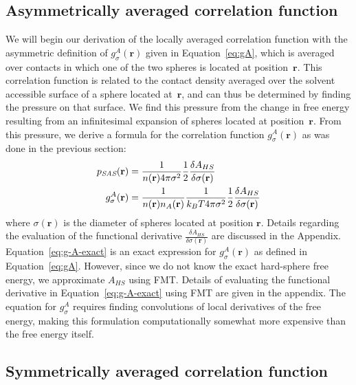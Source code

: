 \documentclass[letterpaper,twocolumn,amsmath,amssymb,pre]{revtex4-1}
\newcommand{\rr}{\textbf{r}}
\newcommand{\derivation}[1]{} %
\begin{document}
\subsection{Asymmetrically averaged correlation function}\label{sec:g-A}

We will begin our derivation of the locally averaged correlation
function with the asymmetric definition of $g_\sigma^A(\rr)$ given in
Equation~\ref{eq:gA}, which is averaged over contacts in which one of
the two spheres is located at position~$\rr$.  This correlation
function is related to the contact density averaged over the solvent accessible surface
of a sphere located at~$\rr$, and can thus be determined by finding
the pressure on that surface.  We find this pressure from the change in
free energy resulting from an infinitesimal expansion of spheres
located at position~$\rr$.  From this pressure, we derive a
formula for the correlation function $g_\sigma^A(\rr)$ as was done in
the previous section:
\begin{align}
  p_{\textit{SAS}}(\mathbf{r}) &= \frac{1}{n(\rr) 4\pi \sigma^2}\frac12 \frac{\delta
    A_{HS}}{\delta \sigma(\mathbf{r})} \label{eq:p_{HS}^A}\\
  g_\sigma^A(\rr)%
  &= \frac{1}{n(\rr) n_A(\rr)}\frac{1}{ k_BT 4\pi \sigma^2}\frac12 \frac{\delta
    A_{HS}}{\delta \sigma(\mathbf{r})} \label{eq:g-A-exact}
\end{align}
where $\sigma(\mathbf{r})$ is the diameter of spheres located at position $\rr$.
Details regarding the evaluation of the functional derivative $\frac{\delta A_{HS}}{\delta \sigma(\mathbf{r})}$
are discussed in the Appendix.
Equation~\ref{eq:g-A-exact} is an exact expression for
$g_\sigma^A(\rr)$ as defined in Equation~\ref{eq:gA}.  However, since
we do not know the exact hard-sphere free energy, we approximate
$A_{HS}$ using FMT.  Details of evaluating the functional derivative
in Equation~\ref{eq:g-A-exact} using FMT are given in the appendix.
The equation for $g_\sigma^A$ requires finding convolutions of local
derivatives of the free energy, making this formulation
computationally somewhat more expensive than the free energy itself.

\derivation{
  \end{widetext}
}

\subsection{Symmetrically averaged correlation function}\label{sec:g-S}
\end{document}
